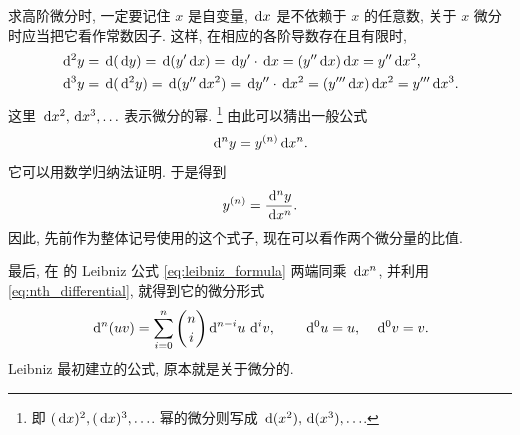 求高阶微分时, 一定要记住 $x$ 是自变量,
$\,\mathrm{d} x$ 是不依赖于 $x$ 的任意数, 关于 $x$ 微分时应当把它看作常数因子.
这样, 在相应的各阶导数存在且有限时,
$$
\begin{aligned}
\,\mathrm{d}^2y
&=\,\mathrm{d}(\,\mathrm{d} y)=\,\mathrm{d}(y'\,\mathrm{d} x)=\,\mathrm{d} y'\cdot\,\mathrm{d} x
=(y''\,\mathrm{d} x)\,\mathrm{d} x=y''\,\mathrm{d} x^2,\\
\,\mathrm{d}^3y
&=\,\mathrm{d}(\,\mathrm{d}^2y)=\,\mathrm{d}(y''\,\mathrm{d} x^2)=\,\mathrm{d} y''\cdot\,\mathrm{d} x^2
=(y'''\,\mathrm{d} x)\,\mathrm{d} x^2=y'''\,\mathrm{d} x^3.
\end{aligned}
$$
这里 $\,\mathrm{d} x^2,\,\mathrm{d} x^3,\ldots$ 表示微分的幂.
\footnote{即 $(\,\mathrm{d} x)^2,(\,\mathrm{d} x)^3,\ldots$.
幂的微分则写成 $\,\mathrm{d}(x^2),\,\mathrm{d}(x^3),\ldots$.}
由此可以猜出一般公式
\begin{equation}\label{eq:nth_differential}
\,\mathrm{d}^ny=y^{(n)}\,\mathrm{d} x^n.
\end{equation}
它可以用数学归纳法证明.
于是得到
$$
y^{(n)}=\frac{\,\mathrm{d}^ny}{\,\mathrm{d} x^n}.
$$
因此, 先前作为整体记号使用的这个式子, 现在可以看作两个微分量的比值.

最后, 在  的 Leibniz 公式
\eqref{eq:leibniz_formula} 两端同乘 $\,\mathrm{d} x^n$, 并利用
\eqref{eq:nth_differential}, 就得到它的微分形式
\label{eq:leibniz_differential_form}
$$
\,\mathrm{d}^n(uv)=\sum_{i=0}^{n}\binom ni\,\mathrm{d}^{n-i}u\,\,\mathrm{d}^iv,
\qquad\,\mathrm{d}^0u=u,\quad\,\mathrm{d}^0v=v.
$$
Leibniz 最初建立的公式, 原本就是关于微分的.

